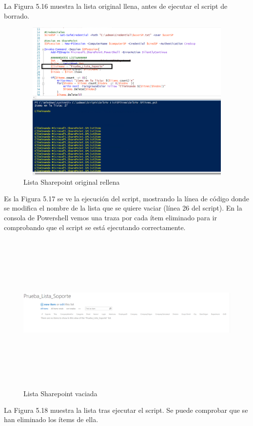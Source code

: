 \documentclass[a4paper, 12pt]{book}
\begin{document}
\begin{itemize}
La Figura 5.16 muestra la lista original llena, antes de ejecutar el script de borrado.

\begin{figure}[H]
	\centering
	\includegraphics[width=15cm, height=8cm, keepaspectratio]{img/image16.png}
	\caption{Lista Sharepoint original rellena}
	\label{fig:image16}
\end{figure}

Es la Figura 5.17 se ve la ejecución del script, mostrando la línea de código donde se modifica el nombre de la lista que se quiere vaciar (línea 26 del script). En la consola de Powershell vemos una traza por cada ítem eliminado para ir comprobando que el script se está ejecutando correctamente.

\begin{figure}[H]
	\centering
	\includegraphics[width=15cm, height=8cm, keepaspectratio]{img/image12.png}
	\caption{Lista Sharepoint vaciada}
	\label{fig:image12}
\end{figure}

La Figura 5.18 muestra la lista tras ejecutar el script. Se puede comprobar que se han eliminado los ítems de ella.

\end{itemize}
\end{document}
